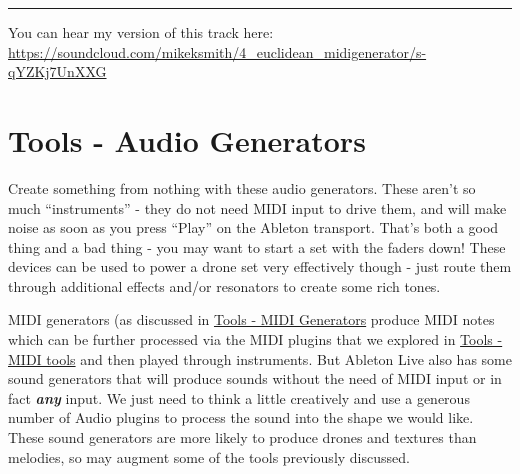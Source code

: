 \documentclass[
  12pt,
  letterpaper,
  oneside,
  open=any]{scrbook}
\begin{document}
\begin{center}\rule{0.5\linewidth}{0.5pt}\end{center}

You can hear my version of this track here:
\href{https://soundcloud.com/mikeksmith/4_euclidean_midigenerator/s-qYZKj7UnXXG?in=mikeksmith/sets/the-lazy-producer-recipes/s-PGMEWqfwKGz&si=6b1ee90238dd4a3c9fe75f66fd1f6623&utm_source=clipboard&utm_medium=text&utm_campaign=social_sharing}{https://soundcloud.com/mikeksmith/4\_euclidean\_midigenerator/s-qYZKj7UnXXG}


\chapter{Tools - Audio Generators}\label{014-Tools-Audio_Generators}

Create something from nothing with these audio generators. These aren't
so much ``instruments'' - they do not need MIDI input to drive them, and
will make noise as soon as you press ``Play'' on the Ableton transport.
That's both a good thing and a bad thing - you may want to start a set
with the faders down! These devices can be used to power a drone set
very effectively though - just route them through additional effects
and/or resonators to create some rich tones.

\begin{tcolorbox}[enhanced jigsaw, toprule=.15mm, leftrule=.75mm, coltitle=black, bottomtitle=1mm, colbacktitle=quarto-callout-tip-color!10!white, bottomrule=.15mm, opacityback=0, colback=white, arc=.35mm, colframe=quarto-callout-tip-color-frame, opacitybacktitle=0.6, toptitle=1mm, titlerule=0mm, rightrule=.15mm, title=\textcolor{quarto-callout-tip-color}{\faLightbulb}\hspace{0.5em}{Key idea}, left=2mm, breakable]

MIDI generators (as discussed in
\hyperref[012-Tools-MIDI_Generators]{Tools - MIDI Generators} produce
MIDI notes which can be further processed via the MIDI plugins that we
explored in \hyperref[004-Tools-MIDI_tools]{Tools - MIDI tools} and then
played through instruments. But Ableton Live also has some sound
generators that will produce sounds without the need of MIDI input or in
fact \textbf{\emph{any}} input. We just need to think a little
creatively and use a generous number of Audio plugins to process the
sound into the shape we would like. These sound generators are more
likely to produce drones and textures than melodies, so may augment some
of the tools previously discussed.

\end{tcolorbox}
\end{document}
